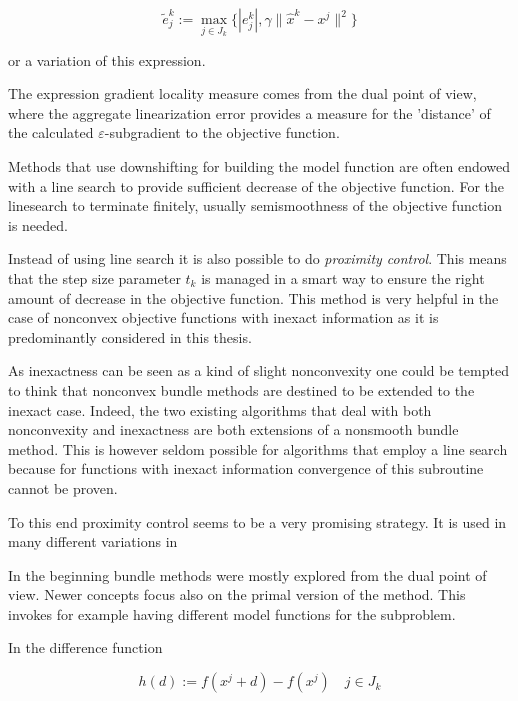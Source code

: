 \begin{equation}
	\tilde{e}_j^k := \max_{j \in J_k} \{|e_j^k|,\gamma \|\hat{x}^k-x^j\|^2\}
\label{subgr_loc_measure}
\end{equation}

or a variation of this expression.

The expression gradient locality measure comes from the dual point of view, where the aggregate linearization error provides a measure for the 'distance' of the calculated \(\varepsilon\)-subgradient to the objective function.

Methods that use downshifting for building the model function are often endowed with a line search to provide sufficient decrease of the objective function. For the linesearch to terminate finitely, usually semismoothness of the objective function is needed.

Instead of using line search it is also possible to do \emph{proximity control}. This means that the step size parameter \(t_k\) is managed in a smart way to ensure the right amount of decrease in the objective function. This method is very helpful in the case of nonconvex objective functions with inexact information as it is predominantly considered in this thesis.

As inexactness can be seen as a kind of slight nonconvexity one could be tempted to think that nonconvex bundle methods are destined to be extended to the inexact case. Indeed, the two existing algorithms \cite{Hare2016,Noll2013} that deal with both nonconvexity and inexactness are both extensions of a nonsmooth bundle method.
This is however seldom possible for algorithms that employ a line search because for functions with inexact information convergence of this subroutine cannot be proven.

To this end proximity control seems to be a very promising strategy. It is used in many different variations in \cite{Apkarian2008, Lewis2015, Noll2005, Noll2010, Noll2012, Schramm1992}

In the beginning bundle methods were mostly explored from the  dual point of view. Newer concepts focus also on the primal version of the method. This invokes for example having different model functions for the subproblem.

In \cite{Fuduli2004, Fuduli2004a} the difference function 

\begin{equation}
	h(d):= f(x^j +d) -f(x^j) \quad j \in J_k
\label{diff_fun}
\end{equation}

